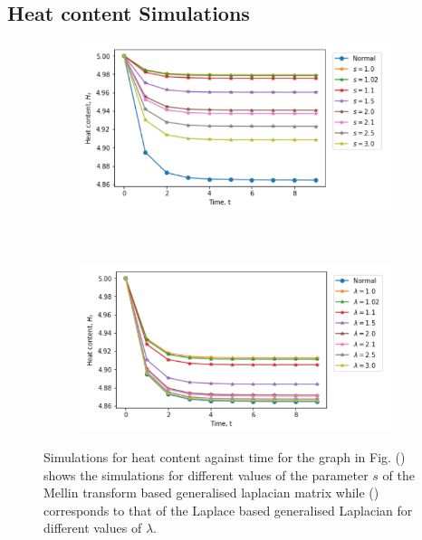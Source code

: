 \documentclass[10pt,a4paper]{article}
\begin{document}
    
    
    \subsection{Heat content Simulations}
    
    \begin{figure}[H]
    	\centering
    	\begin{subfigure}[b]{0.5\textwidth}
    		\includegraphics[width= \textwidth]{images/Mellin-heatcontent.png}
    		\caption{}
    		\label{mellin-heatcont}
    	\end{subfigure}~
    	\begin{subfigure}[b]{0.5\textwidth}
    		\includegraphics[width= \textwidth]{images/Laplace-heatcontent.png}
    		\caption{ }
    		\label{laplace-heatcont}
    	\end{subfigure}
    	\caption{Simulations for heat content against time for the graph in Fig. () shows the simulations for different values of the parameter $s$ of the Mellin transform based generalised laplacian matrix while () corresponds to that of the Laplace based generalised Laplacian for different values of $\lambda$. }
    	\label{}
    \end{figure}
 
\end{document}
